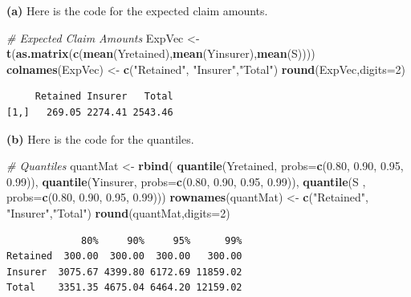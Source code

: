 \documentclass[]{book}
\newenvironment{Shaded}{\begin{snugshade}}{\end{snugshade}}
\newcommand{\KeywordTok}[1]{\textcolor[rgb]{0.13,0.29,0.53}{\textbf{{#1}}}}
\newcommand{\DataTypeTok}[1]{\textcolor[rgb]{0.13,0.29,0.53}{{#1}}}
\newcommand{\DecValTok}[1]{\textcolor[rgb]{0.00,0.00,0.81}{{#1}}}
\newcommand{\FloatTok}[1]{\textcolor[rgb]{0.00,0.00,0.81}{{#1}}}
\newcommand{\StringTok}[1]{\textcolor[rgb]{0.31,0.60,0.02}{{#1}}}
\newcommand{\CommentTok}[1]{\textcolor[rgb]{0.56,0.35,0.01}{\textit{{#1}}}}
\newcommand{\NormalTok}[1]{{#1}}
\theoremstyle{definition}
\theoremstyle{definition}
\theoremstyle{definition}
\theoremstyle{remark}
\begin{document}
\textbf{(a)} Here is the code for the expected claim amounts.

\begin{Shaded}
\begin{Highlighting}[]
\CommentTok{# Expected Claim Amounts}
\NormalTok{ExpVec <-}\StringTok{ }\KeywordTok{t}\NormalTok{(}\KeywordTok{as.matrix}\NormalTok{(}\KeywordTok{c}\NormalTok{(}\KeywordTok{mean}\NormalTok{(Yretained),}\KeywordTok{mean}\NormalTok{(Yinsurer),}\KeywordTok{mean}\NormalTok{(S))))}
\KeywordTok{colnames}\NormalTok{(ExpVec) <-}\StringTok{ }\KeywordTok{c}\NormalTok{(}\StringTok{"Retained"}\NormalTok{, }\StringTok{"Insurer"}\NormalTok{,}\StringTok{"Total"}\NormalTok{)}
\KeywordTok{round}\NormalTok{(ExpVec,}\DataTypeTok{digits=}\DecValTok{2}\NormalTok{)}
\end{Highlighting}
\end{Shaded}

\begin{verbatim}
     Retained Insurer   Total
[1,]   269.05 2274.41 2543.46
\end{verbatim}

\textbf{(b)} Here is the code for the quantiles.

\begin{Shaded}
\begin{Highlighting}[]
\CommentTok{# Quantiles}
\NormalTok{quantMat <-}\StringTok{ }\KeywordTok{rbind}\NormalTok{(}
  \KeywordTok{quantile}\NormalTok{(Yretained, }\DataTypeTok{probs=}\KeywordTok{c}\NormalTok{(}\FloatTok{0.80}\NormalTok{, }\FloatTok{0.90}\NormalTok{, }\FloatTok{0.95}\NormalTok{, }\FloatTok{0.99}\NormalTok{)),}
  \KeywordTok{quantile}\NormalTok{(Yinsurer,  }\DataTypeTok{probs=}\KeywordTok{c}\NormalTok{(}\FloatTok{0.80}\NormalTok{, }\FloatTok{0.90}\NormalTok{, }\FloatTok{0.95}\NormalTok{, }\FloatTok{0.99}\NormalTok{)),}
  \KeywordTok{quantile}\NormalTok{(S       ,  }\DataTypeTok{probs=}\KeywordTok{c}\NormalTok{(}\FloatTok{0.80}\NormalTok{, }\FloatTok{0.90}\NormalTok{, }\FloatTok{0.95}\NormalTok{, }\FloatTok{0.99}\NormalTok{)))}
\KeywordTok{rownames}\NormalTok{(quantMat) <-}\StringTok{ }\KeywordTok{c}\NormalTok{(}\StringTok{"Retained"}\NormalTok{, }\StringTok{"Insurer"}\NormalTok{,}\StringTok{"Total"}\NormalTok{)}
\KeywordTok{round}\NormalTok{(quantMat,}\DataTypeTok{digits=}\DecValTok{2}\NormalTok{)}
\end{Highlighting}
\end{Shaded}

\begin{verbatim}
             80%     90%     95%      99%
Retained  300.00  300.00  300.00   300.00
Insurer  3075.67 4399.80 6172.69 11859.02
Total    3351.35 4675.04 6464.20 12159.02
\end{verbatim}
\end{document}
